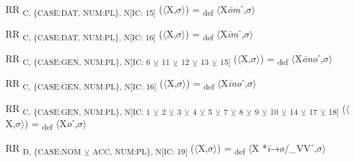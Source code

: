 {\begin{exe}
 RR \textsubscript{C, \{CASE:DAT, NUM:PL\}, N[IC: 15]} ($\langle$X,$\sigma $$\rangle$) = \textsubscript{def} $\langle$X\textit{\=om}ˊ,$\sigma $$\rangle$
\end{exe}

\begin{exe}
 RR \textsubscript{C, \{CASE:DAT, NUM:PL\}, N[IC: 16]} ($\langle$X,$\sigma $$\rangle$) = \textsubscript{def} $\langle$X\textit{\=im}ˊ,$\sigma $$\rangle$
\end{exe}

\begin{exe}
 RR \textsubscript{C, \{CASE:GEN, NUM:PL\}, N[IC: 6} \textsubscript{${\veebar}$}\textsubscript{ 11} \textsubscript{${\veebar}$}\textsubscript{ 12} \textsubscript{${\veebar}$}\textsubscript{ 13} \textsubscript{${\veebar}$}\textsubscript{ 15]} ($\langle$X,$\sigma $$\rangle$) = \textsubscript{def} $\langle$X\textit{\=ono}ˊ,$\sigma $$\rangle$
\end{exe}

\begin{exe}
 RR \textsubscript{C, \{CASE:GEN, NUM:PL\}, N[IC: 16]} ($\langle$X,$\sigma $$\rangle$) = \textsubscript{def} $\langle$X\textit{\=ino}ˊ,$\sigma $$\rangle$
\end{exe}

\begin{exe}
 RR \textsubscript{C, \{CASE:GEN, NUM:PL\}, N[IC: 1} \textsubscript{${\veebar}$}\textsubscript{ 2} \textsubscript{${\veebar}$}\textsubscript{ 3} \textsubscript{${\veebar}$}\textsubscript{ 4} \textsubscript{${\veebar}$}\textsubscript{ 5} \textsubscript{${\veebar}$}\textsubscript{ 7} \textsubscript{${\veebar}$}\textsubscript{ 8} \textsubscript{${\veebar}$}\textsubscript{ 9} \textsubscript{${\veebar}$}\textsubscript{ 10} \textsubscript{${\veebar}$}\textsubscript{ 14} \textsubscript{${\veebar}$}\textsubscript{ 17} \textsubscript{${\veebar}$}\textsubscript{ 18]} ($\langle$X,$\sigma $$\rangle$) = \textsubscript{def} $\langle$X\textit{o}ˊ,$\sigma $$\rangle$
\end{exe}

\begin{exe}
 RR \textsubscript{D, \{CASE:NOM} \textsubscript{${\veebar}$}\textsubscript{ ACC, NUM:PL\}, N[IC: 19]} ($\langle$X,$\sigma $$\rangle$) = \textsubscript{def} $\langle$X *\textit{\=i}→ø/\_VVˊ,$\sigma $$\rangle$
\end{exe}

}
